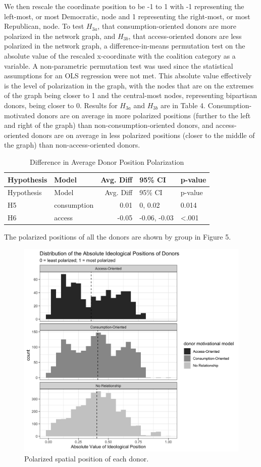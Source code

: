 \documentclass[12pt,]{article}
\begin{document}
We then rescale the coordinate position to be -1 to 1 with -1
representing the left-most, or most Democratic, node and 1 representing
the right-most, or most Republican, node. To test \(H_{3a}\), that
consumption-oriented donors are more polarized in the network graph, and
\(H_{3b}\), that access-oriented donors are less polarized in the
network graph, a difference-in-means permutation test on the absolute
value of the rescaled x-coordinate with the coalition category as a
variable. A non-parametric permutation test was used since the
statistical assumptions for an OLS regression were not met. This
absolute value effectively is the level of polarization in the graph,
with the nodes that are on the extremes of the graph being closer to 1
and the central-most nodes, representing bipartisan donors, being closer
to 0. Results for \(H_{3a}\) and \(H_{3b}\) are in Table 4.
Consumption-motivated donors are on average in more polarized positions
(further to the left and right of the graph) than
non-consumption-oriented donors, and access-oriented donors are on
average in less polarized positions (closer to the middle of the graph)
than non-access-oriented donors.

\begin{longtable}[]{@{}llrll@{}}
\caption{Difference in Average Donor Position
Polarization}\tabularnewline
\toprule
Hypothesis & Model & Avg. Diff & 95\% CI & p-value\tabularnewline
\midrule
\endfirsthead
\toprule
Hypothesis & Model & Avg. Diff & 95\% CI & p-value\tabularnewline
\midrule
\endhead
H5 & consumption & 0.01 & 0, 0.02 & 0.014\tabularnewline
H6 & access & -0.05 & -0.06, -0.03 & \textless.001\tabularnewline
\bottomrule
\end{longtable}

The polarized positions of all the donors are shown by group in Figure
5.

\begin{figure}
\centering
\includegraphics{../tables_and_figures/fig_node_position_absolute.jpg}
\caption{Polarized spatial position of each donor.}
\end{figure}
\end{document}
